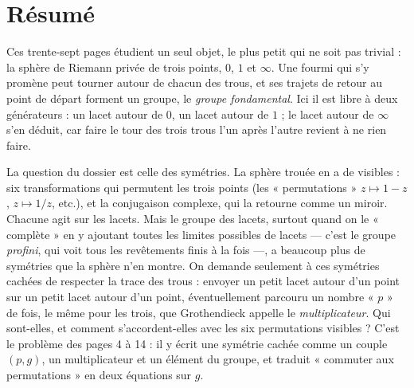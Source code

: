 \documentclass[11pt,a4paper]{article}
\begin{document}
\section*{Résumé}

\begin{resume}
Ces trente-sept pages étudient un seul objet, le plus petit qui ne soit pas
trivial : la sphère de Riemann privée de trois points, $0$, $1$ et $\infty$.
Une fourmi qui s'y promène peut tourner autour de chacun des trous, et ses
trajets de retour au point de départ forment un groupe, le \emph{groupe
fondamental}. Ici il est libre à deux générateurs : un lacet autour de $0$, un
lacet autour de $1$ ; le lacet autour de $\infty$ s'en déduit, car faire le
tour des trois trous l'un après l'autre revient à ne rien faire.

La question du dossier est celle des symétries. La sphère trouée en a de
visibles : six transformations qui permutent les trois points (les
« permutations » $z \mapsto 1-z$, $z \mapsto 1/z$, etc.), et la conjugaison
complexe, qui la retourne comme un miroir. Chacune agit sur les lacets. Mais le
groupe des lacets, surtout quand on le « complète » en y ajoutant toutes les
limites possibles de lacets — c'est le groupe \emph{profini}, qui voit tous les
revêtements finis à la fois —, a beaucoup plus de symétries que la sphère n'en
montre. On demande seulement à ces symétries cachées de respecter la trace des
trous : envoyer un petit lacet autour d'un point sur un petit lacet autour d'un
point, éventuellement parcouru un nombre « $p$ » de fois, le même pour les
trois, que Grothendieck appelle le \emph{multiplicateur}. Qui sont-elles, et
comment s'accordent-elles avec les six permutations visibles ? C'est le
problème des pages 4 à 14 : il y écrit une symétrie cachée comme un couple
$(p, g)$, un multiplicateur et un élément du groupe, et traduit « commuter aux
permutations » en deux équations sur $g$.


\end{resume}
\end{document}
